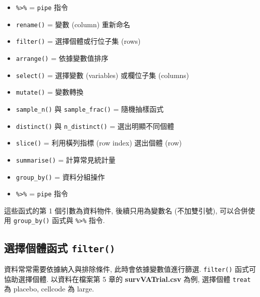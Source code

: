 \documentclass[
]{book}
\providecommand{\tightlist}{%
  \setlength{\itemsep}{0pt}\setlength{\parskip}{0pt}}
\begin{document}
\begin{itemize}
\tightlist
\item
  \texttt{\%\textgreater{}\%} = \texttt{pipe} 指令
\item
  \texttt{rename()} = 變數 (column) 重新命名
\item
  \texttt{filter()} = 選擇個體或行位子集 (rows)
\item
  \texttt{arrange()} = 依據變數值排序
\item
  \texttt{select()} = 選擇變數 (variables) 或欄位子集 (columns)
\item
  \texttt{mutate()} = 變數轉換
\item
  \texttt{sample\_n()} 與 \texttt{sample\_frac()} = 隨機抽樣函式
\item
  \texttt{distinct()} 與 \texttt{n\_distinct()} = 選出明顯不同個體
\item
  \texttt{slice()} = 利用橫列指標 (row index) 選出個體 (row)
\item
  \texttt{summarise()} = 計算常見統計量
\item
  \texttt{group\_by()} = 資料分組操作
\item
  \texttt{\%\textgreater{}\%} = \texttt{pipe} 指令
\end{itemize}

這些函式的第 1 個引數為資料物件,
後續只用為變數名 (不加雙引號),
可以合併使用 \texttt{group\_by()} 函式與 \texttt{\%\textgreater{}\%} 指令.

\hypertarget{ux9078ux64c7ux500bux9ad4ux51fdux5f0f-filter}{%
\subsection{\texorpdfstring{選擇個體函式 \texttt{filter()}}{選擇個體函式 filter()}}\label{ux9078ux64c7ux500bux9ad4ux51fdux5f0f-filter}}

資料常常需要依據納入與排除條件,
此時會依據變數值進行篩選.
\texttt{filter()} 函式可協助選擇個體.
以資料在檔案第 5 章的 \textbf{survVATrial.csv} 為例,
選擇個體 \texttt{treat} 為 placebo, cellcode 為 large.
\end{document}
